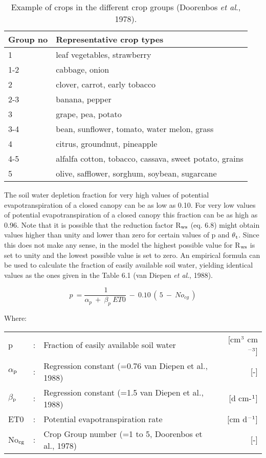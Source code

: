 \begin{table}
\caption{Example of crops in the different crop groups (Doorenbos {\it et al\/}., 1978).}
\label{tbl:ExampleCropGroups}
\begin{tabularx}{\textwidth}{lX}
\hline
Group no & Representative crop types\\
\hline
1 & leaf vegetables, strawberry\\     
1-2 & cabbage, onion\\
2 & clover, carrot, early tobacco\\     
2-3 & banana, pepper\\
3 & grape, pea, potato\\
3-4 & bean, sunflower, tomato, water melon, grass\\
4 & citrus, groundnut, pineapple\\
4-5 & alfalfa cotton, tobacco, cassava, sweet potato, grains\\
5 & olive, safflower, sorghum, soybean, sugarcane\\
\hline
\end{tabularx}
\end{table}

The soil water depletion fraction for very high values of potential evapotranspir\-ation of a
closed canopy can be as low as 0.10. For very low values of potential evapotranspiration
of a closed canopy this fraction can be as high as 0.96.
Note that it is possible that the reduction factor R$_{{\rm ws}}$ (eq. 6.8) might obtain values higher
than unity and lower than zero for certain values of p and $\theta$$_{{\rm t}}$. Since this does not make
any sense, in the model the highest possible value for R$_{{\rm ws}}$ is set to unity and the lowest
possible value is set to zero.
An empirical formula can be used to calculate the fraction of easily available soil water,
yielding identical values as the ones given in the Table 6.1 (van Diepen {\it et al\/}., 1988).

\begin{equation}
p~={\frac{~1}{ \alpha _{p} ~+~ \beta _{p} ~ET0}} ~-~ 0.10\, (\, 5~-~No _{cg} \, )
\end{equation}

Where:\\
\begin{tabularx}{\textwidth}{llXr}
p &:& Fraction of easily available soil water  & [cm$^{{\rm 3}}$ cm$^{{\rm -3}}$]\\
$\alpha$$_{{\rm p}}$ &:& Regression constant {\small (=0.76 van Diepen et al., 1988)}  & [-]\\
$\beta$$_{{\rm p}}$ &:& Regression constant {\small (=1.5 van Diepen et al., 1988)}  & [d cm-$^{{\rm 1}}$]\\
ET0 &:& Potential evapotranspiration rate  & [cm d$^{{\rm -1}}$]\\
No$_{{\rm cg}}$ &:& Crop Group number {\small (=1 to 5, Doorenbos et al., 1978)}  & [-]\\
\end{tabularx}
 
